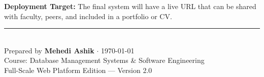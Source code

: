 \documentclass[12pt,a4paper]{article}
\begin{document}
\begin{notebox}
\textbf{Deployment Target:} The final system will have a live URL that can be shared with faculty, peers, and included in a portfolio or CV.
\end{notebox}

\vspace{1.5cm}
\begin{center}
  {\color{primary}\rule{0.7\linewidth}{1.5pt}}\\[0.5em]
  {\color{gray}Prepared by \textbf{Mehedi Ashik} $\cdot$ \today}\\[0.2em]
  {\color{gray}\small Course: Database Management Systems \& Software Engineering}\\[0.2em]
  {\color{gray}\small Full-Scale Web Platform Edition --- Version 2.0}
\end{center}
\end{document}
